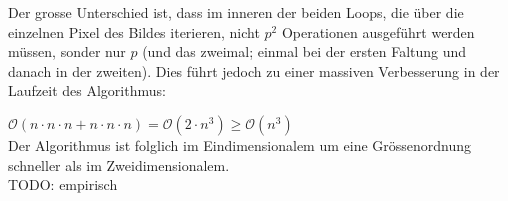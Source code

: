 \documentclass{article} %
\begin{document}
Der grosse Unterschied ist, dass im inneren der beiden Loops, die über die einzelnen Pixel des Bildes iterieren, nicht $p^2$ Operationen ausgeführt werden müssen, sonder nur $p$ (und das zweimal; einmal bei der ersten Faltung und danach in der zweiten). Dies führt jedoch zu einer massiven Verbesserung in der Laufzeit des Algorithmus:

$\mathcal{O} (n \cdot n \cdot n + n \cdot n \cdot n) = \mathcal{O}(2 \cdot n^3) \geq \mathcal{O} (n^3)$ \\
Der Algorithmus ist folglich im Eindimensionalem um eine Grössenordnung schneller als im Zweidimensionalem.\\
TODO: empirisch
\end{document}
